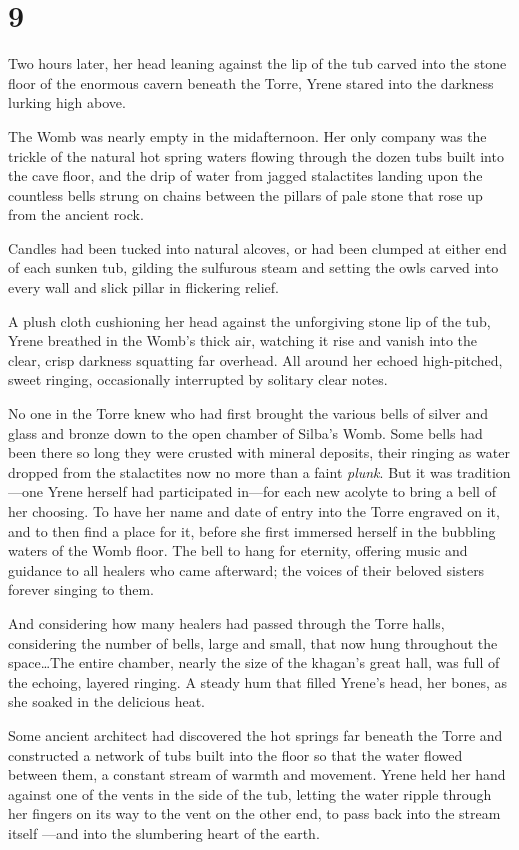 
\chapter{9}

Two hours later, her head leaning against the lip of the tub carved into the stone floor of the enormous cavern beneath the Torre, Yrene stared into the darkness lurking high above.

The Womb was nearly empty in the midafternoon.
Her only company was the trickle of the natural hot spring waters flowing through the dozen tubs built into the cave floor, and the drip of water from jagged stalactites landing upon the countless bells strung on chains between the pillars of pale stone that rose up from the ancient rock.

Candles had been tucked into natural alcoves, or had been clumped at either end of each sunken tub, gilding the sulfurous steam and setting the owls carved into every wall and slick pillar in flickering relief.

A plush cloth cushioning her head against the unforgiving stone lip of the tub, Yrene breathed in the Womb's thick air, watching it rise and vanish into the clear, crisp darkness squatting far overhead.
All around her echoed high-pitched, sweet ringing, occasionally interrupted by solitary clear notes.

No one in the Torre knew who had first brought the various bells of silver and glass and bronze down to the open chamber of Silba's Womb.
Some bells had been there so long they were crusted with mineral deposits, their ringing as water dropped from the stalactites now no more than a faint \emph{plunk}.
But it was tradition ---one Yrene herself had participated in---for each new acolyte to bring a bell of her choosing.
To have her name and date of entry into the Torre engraved on it, and to then find a place for it, before she first immersed herself in the bubbling waters of the Womb floor.
The bell to hang for eternity, offering music and guidance to all healers who came afterward;
the voices of their beloved sisters forever singing to them.

And considering how many healers had passed through the Torre halls, considering the number of bells, large and small, that now hung throughout the space\ldots The entire chamber, nearly the size of the khagan's great hall, was full of the echoing, layered ringing.
A steady hum that filled Yrene's head, her bones, as she soaked in the delicious heat.

Some ancient architect had discovered the hot springs far beneath the Torre and constructed a network of tubs built into the floor so that the water flowed between them, a constant stream of warmth and movement.
Yrene held her hand against one of the vents in the side of the tub, letting the water ripple through her fingers on its way to the vent on the other end, to pass back into the stream itself ---and into the slumbering heart of the earth.

